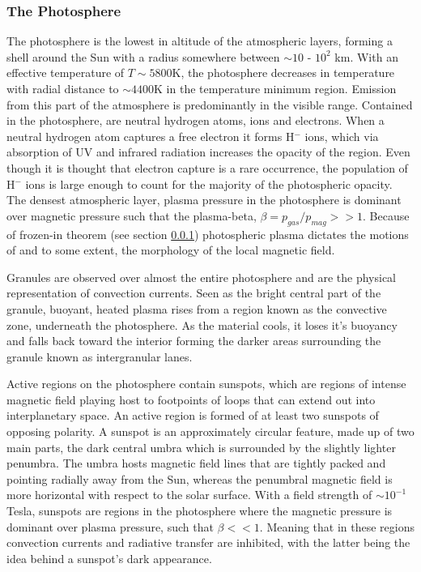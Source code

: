 \subsubsection{The Photosphere}
The photosphere is the lowest in altitude of the atmospheric layers, forming a shell around the Sun with a radius somewhere between $\sim10$ - $10^{2}$ km. With an effective temperature of $T\sim5800$K, the photosphere decreases in temperature with radial distance to $\sim4400$K in the temperature minimum region. Emission from this part of the atmosphere is predominantly in the visible range. Contained in the photosphere, are neutral hydrogen atoms, ions and electrons. When a neutral hydrogen atom captures a free electron it forms H$^{-}$ ions, which via absorption of UV and infrared radiation increases the opacity of the region. Even though it is thought that electron capture is a rare occurrence, the population of H$^{-}$ ions is large enough to count for the majority of the photospheric opacity. The densest atmospheric layer, plasma pressure in the photosphere is dominant over magnetic pressure such that the plasma-beta, $\beta = p_{gas}/p_{mag} >> 1$. Because of frozen-in theorem (see section \ref{}) photospheric plasma dictates the motions of and to some extent, the morphology of the local magnetic field.

Granules are observed over almost the entire photosphere and are the physical representation of convection currents. Seen as the bright central part of the granule, buoyant, heated plasma rises from a region known as the convective zone, underneath the photosphere. As the material cools, it loses it's buoyancy and falls back toward the interior forming the darker areas surrounding the granule known as intergranular lanes.

Active regions on the photosphere contain sunspots, which are regions of intense magnetic field playing host to footpoints of loops that can extend out into interplanetary space. An active region is formed of at least two sunspots of opposing polarity. 
A sunspot is an approximately circular feature, made up of two main parts, the dark central umbra which is surrounded by the slightly lighter penumbra. The umbra hosts magnetic field lines that are tightly packed and pointing radially away from the Sun, whereas the penumbral magnetic field is more horizontal with respect to the solar surface. With a field strength of $\sim 10^{-1}$ Tesla, sunspots are regions in the photosphere where the magnetic pressure is dominant over plasma pressure, such that $\beta << 1$. Meaning that in these regions convection currents and radiative transfer are inhibited, with the latter being the idea behind a sunspot's dark appearance. \\



